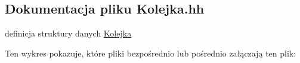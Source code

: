 \hypertarget{_kolejka_8hh}{}\subsection{Dokumentacja pliku Kolejka.\+hh}
\label{_kolejka_8hh}


definicja struktury danych \hyperlink{class_kolejka}{Kolejka}  


Ten wykres pokazuje, które pliki bezpośrednio lub pośrednio załączają ten plik\+:
